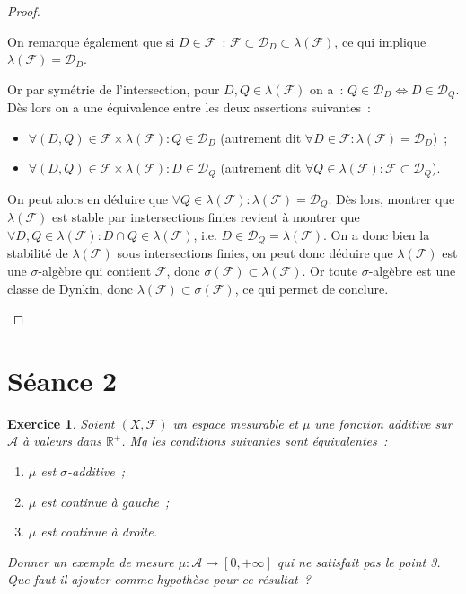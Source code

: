 \documentclass{article}
\newtheorem{ex}{Exercice}[section]
\theoremstyle{definition}
\newcommand{\pinfty}{{+\infty}}
\begin{document}
\begin{proof}
\begin{enumerate}
	On remarque également que si $D \in \mathcal F$~: $\mathcal F \subset \mathcal D_D \subset \lambda(\mathcal F)$, ce qui implique $\lambda(\mathcal F) = \mathcal D_D$.

	Or par symétrie de l'intersection, pour $D, Q \in \lambda(\mathcal F)$ on a~: $Q \in \mathcal D_D \iff D \in \mathcal D_Q$. Dès lors on a une équivalence entre les deux
	assertions suivantes~:
	\begin{itemize}
		\item $\forall (D, Q) \in \mathcal F \times \lambda(\mathcal F) : Q \in \mathcal D_D$ (autrement dit $\forall D \in \mathcal F : \lambda(\mathcal F) = \mathcal D_D$)~;
		\item $\forall (D, Q) \in \mathcal F \times \lambda(\mathcal F) : D \in \mathcal D_Q$ (autrement dit $\forall Q \in \lambda(\mathcal F) : \mathcal F \subset \mathcal D_Q$).
	\end{itemize}

	On peut alors en déduire que $\forall Q \in \lambda(\mathcal F) : \lambda(\mathcal F) = \mathcal D_Q$. Dès lors, montrer que $\lambda(\mathcal F)$ est stable par
	instersections finies revient à montrer que $\forall D, Q \in \lambda(\mathcal F) : D \cap Q \in \lambda(\mathcal F)$, i.e. $D \in \mathcal D_Q = \lambda(\mathcal F)$.
	On a donc bien la stabilité de $\lambda(\mathcal F)$ sous intersections finies, on peut donc déduire que $\lambda(\mathcal F)$ est une $\sigma$-algèbre qui contient $\mathcal F$,
	donc $\sigma(\mathcal F) \subset \lambda(\mathcal F)$. Or toute $\sigma$-algèbre est une classe de Dynkin, donc $\lambda(\mathcal F) \subset \sigma(\mathcal F)$, ce qui permet
	de conclure.
\end{enumerate}
\end{proof}

\newpage
\section{Séance 2}

\begin{ex} Soient $(X, \mathcal F)$ un espace mesurable et $\mu$ une fonction additive sur $\mathcal A$ à valeurs dans $\mathbb R^+$. Mq les conditions suivantes sont équivalentes~:
\begin{enumerate}
	\item $\mu$ est $\sigma$-additive~;
	\item $\mu$ est continue à gauche~;
	\item $\mu$ est continue à droite.
\end{enumerate}

Donner un exemple de mesure $\mu : \mathcal A \to [0, \pinfty]$ qui ne satisfait pas le point 3. Que faut-il ajouter comme hypothèse pour ce résultat~?
\end{ex}
\end{document}
